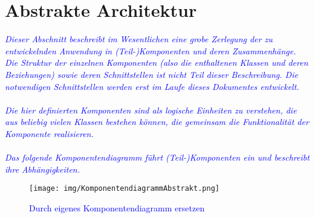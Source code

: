 \section{Abstrakte Architektur}
\textcolor{blue}{\textit{Dieser Abschnitt beschreibt im Wesentlichen eine grobe Zerlegung der zu entwickelnden Anwendung in (Teil-)Komponenten und deren Zusammenhänge. Die Struktur der einzelnen Komponenten (also die enthaltenen Klassen und deren Beziehungen) sowie deren Schnittstellen ist nicht Teil dieser Beschreibung. Die notwendigen Schnittstellen werden erst im Laufe dieses Dokumentes entwickelt.\\\\
Die hier definierten Komponenten sind als logische Einheiten zu verstehen, die aus beliebig vielen Klassen bestehen können, die gemeinsam die Funktionalität der Komponente realisieren.\\\\
Das folgende Komponentendiagramm führt (Teil-)Komponenten ein und beschreibt ihre Abhängigkeiten.
}}

\begin{figure}[H]
\centering
\texttt{[image: img/KomponentendiagrammAbstrakt.png]}
\caption{\textcolor{blue}{Durch eigenes Komponentendiagramm ersetzen}}
\label{KomponentendiagrammAbstrakt}
\end{figure}
